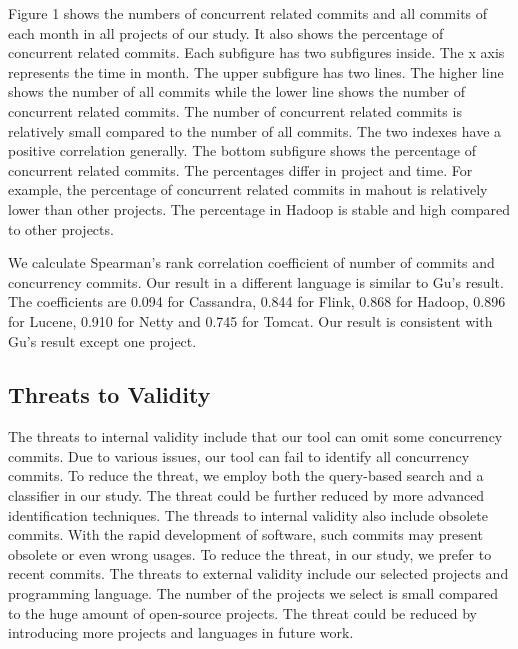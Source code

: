 Figure 1 shows the numbers of concurrent related commits and all commits of each month in all projects of our study. It also shows the percentage of concurrent related commits. Each subfigure has two subfigures inside. The x axis represents the time in month. The upper subfigure has two lines. The higher line shows the number of all commits while the lower line shows the number of concurrent related commits. The number of concurrent related commits is relatively small compared to the number of all commits. The two indexes have a positive correlation generally. The bottom subfigure shows the percentage of concurrent related commits. The percentages differ in project and time. For example, the percentage of concurrent related commits in mahout is relatively lower than other projects. The percentage in Hadoop is stable and high compared to other projects.
 
We calculate Spearman's rank correlation coefficient of number of commits and concurrency commits. Our result in a different language is similar to Gu's result. The coefficients are 0.094 for Cassandra, 0.844 for Flink, 0.868 for Hadoop, 0.896 for Lucene, 0.910 for Netty and 0.745 for Tomcat. Our result is consistent with Gu's result except one project.


\subsection{Threats to Validity}

The threats to internal validity include that our tool can omit some concurrency commits. Due to various issues, our tool can fail to identify all concurrency commits. To reduce the threat, we employ both the query-based search and a classifier in our study. The threat could be further reduced by more advanced identification techniques. The threads to internal validity also include obsolete commits. With the rapid development of software, such commits may present obsolete or even wrong usages. To reduce the threat, in our study, we prefer to recent commits. The threats to external validity include our selected projects and programming language. The number of the projects we select is small compared to the huge amount of open-source projects. The threat could be reduced by introducing more projects and languages in future work.

